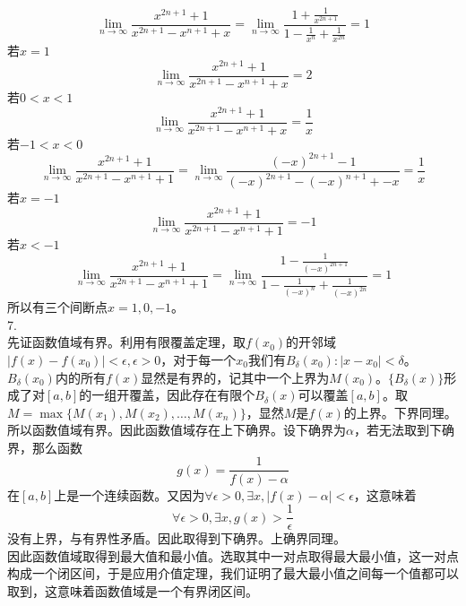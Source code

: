 \documentclass[utf8]{ctexart}
\begin{document}
\[\lim\limits_{n\rightarrow\infty}\frac{x^{2n+1}+1}{x^{2n+1}-x^{n+1}+x}=\lim\limits_{n\rightarrow\infty}\frac{1+\frac{1}{x^{2n+1}}}{1-\frac{1}{x^n}+\frac{1}{x^{2n}}}=1\]
若$x=1$
\[\lim\limits_{n\rightarrow\infty}\frac{x^{2n+1}+1}{x^{2n+1}-x^{n+1}+x}=2\]
若$0<x<1$
\[\lim\limits_{n\rightarrow\infty}\frac{x^{2n+1}+1}{x^{2n+1}-x^{n+1}+x}=\frac{1}{x}\]
若$-1<x<0$
\[\lim\limits_{n\rightarrow\infty}\frac{x^{2n+1}+1}{x^{2n+1}-x^{n+1}+1}=\lim\limits_{n\rightarrow\infty}\frac{(-x)^{2n+1}-1}{(-x)^{2n+1}-(-x)^{n+1}+-x}=\frac{1}{x}\]
若$x=-1$
\[\lim\limits_{n\rightarrow\infty}\frac{x^{2n+1}+1}{x^{2n+1}-x^{n+1}+1}=-1\]
若$x<-1$
\[\lim\limits_{n\rightarrow\infty}\frac{x^{2n+1}+1}{x^{2n+1}-x^{n+1}+1}=\lim\limits_{n\rightarrow\infty}\frac{1-\frac{1}{(-x)^{2n+1}}}{1-\frac{1}{(-x)^n}+\frac{1}{(-x)^{2n}}}=1\]
所以有三个间断点$x=1,0,-1$。\\
7.\\
先证函数值域有界。利用有限覆盖定理，取$f(x_0)$的开邻域$|f(x)-f(x_0)|<\epsilon,\epsilon>0$，对于每一个$x_0$我们有$B_\delta(x_0):|x-x_0|<\delta$。$B_\delta(x_0)$内的所有$f(x)$显然是有界的，记其中一个上界为$M(x_0)$。$\{B_\delta(x)\}$形成了对$[a,b]$的一组开覆盖，因此存在有限个$B_\delta(x)$可以覆盖$[a,b]$。取$M=\max\{M(x_1),M(x_2),\dots,M(x_n)\}$，显然$M$是$f(x)$的上界。下界同理。\\
所以函数值域有界。因此函数值域存在上下确界。设下确界为$\alpha$，若无法取到下确界，那么函数
\[g(x)=\frac{1}{f(x)-\alpha}\]
在$[a,b]$上是一个连续函数。又因为$\forall\epsilon>0,\exists x,|f(x)-\alpha|<\epsilon$，这意味着
\[\forall\epsilon>0,\exists x,g(x)>\frac{1}{\epsilon}\]
没有上界，与有界性矛盾。因此取得到下确界。上确界同理。\\
因此函数值域取得到最大值和最小值。选取其中一对点取得最大最小值，这一对点构成一个闭区间，于是应用介值定理，我们证明了最大最小值之间每一个值都可以取到，这意味着函数值域是一个有界闭区间。
\end{document}
